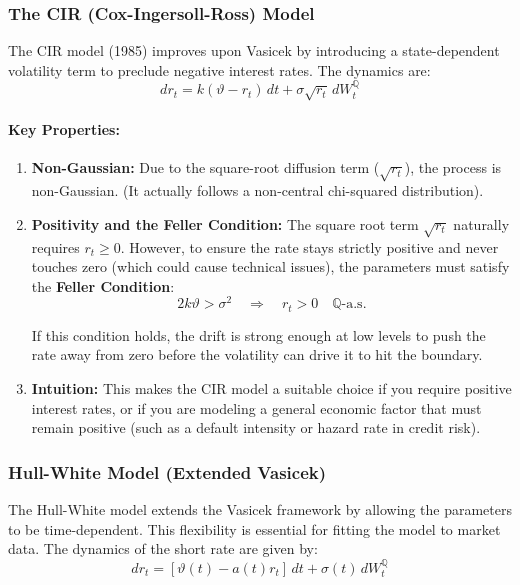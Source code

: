 \documentclass[12pt,a4paper]{article}
\theoremstyle{definition}
\newcommand{\Q}{\mathbb{Q}}
\begin{document}
\subsubsection{The CIR (Cox-Ingersoll-Ross) Model}

The CIR model (1985) improves upon Vasicek by introducing a state-dependent volatility term to preclude negative interest rates. The dynamics are:
\[
dr_t = k(\vartheta - r_t)\,dt + \sigma\sqrt{r_t}\,dW_t^{\Q}
\]

\paragraph{Key Properties:}

\begin{enumerate}
\item \textbf{Non-Gaussian:} Due to the square-root diffusion term ($\sqrt{r_t}$), the process is non-Gaussian. (It actually follows a non-central chi-squared distribution).

\item \textbf{Positivity and the Feller Condition:} The square root term $\sqrt{r_t}$ naturally requires $r_t \geq 0$. However, to ensure the rate stays strictly positive and never touches zero (which could cause technical issues), the parameters must satisfy the \textbf{Feller Condition}:
\[
2k\vartheta > \sigma^2 \quad \Longrightarrow \quad r_t > 0 \quad \Q\text{-a.s.}
\]

If this condition holds, the drift is strong enough at low levels to push the rate away from zero before the volatility can drive it to hit the boundary.

\item \textbf{Intuition:} This makes the CIR model a suitable choice if you require positive interest rates, or if you are modeling a general economic factor that must remain positive (such as a default intensity or hazard rate in credit risk).
\end{enumerate}

\subsubsection{Hull-White Model (Extended Vasicek)}

The Hull-White model extends the Vasicek framework by allowing the parameters to be time-dependent. This flexibility is essential for fitting the model to market data. The dynamics of the short rate are given by:
\[
dr_t = [\vartheta(t) - a(t)r_t]\,dt + \sigma(t)\,dW_t^{\Q}
\]
\end{document}
